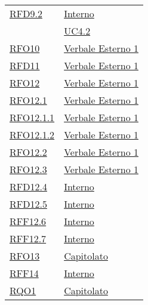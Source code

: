 \begin{longtable}{|>{\centering}m{5cm}|m{5cm}<{\centering}|}
\hyperlink{RFD9.2}{RFD9.2} & \hyperlink{Interno}{Interno}\\
& \hyperref[UC4.2]{UC4.2}\\ \hline

\hyperlink{RFO10}{RFO10} & \hyperlink{Verbale Esterno 1}{Verbale Esterno 1}\\ \hline

\hyperlink{RFD11}{RFD11} & \hyperlink{Verbale Esterno 1}{Verbale Esterno 1}\\ \hline

\hyperlink{RFO12}{RFO12} & \hyperlink{Verbale Esterno 1}{Verbale Esterno 1}\\ \hline

\hyperlink{RFO12.1}{RFO12.1} & \hyperlink{Verbale Esterno 1}{Verbale Esterno 1}\\ \hline

\hyperlink{RFO12.1.1}{RFO12.1.1} & \hyperlink{Verbale Esterno 1}{Verbale Esterno 1}\\ \hline

\hyperlink{RFO12.1.2}{RFO12.1.2} & \hyperlink{Verbale Esterno 1}{Verbale Esterno 1}\\ \hline

\hyperlink{RFO12.2}{RFO12.2} & \hyperlink{Verbale Esterno 1}{Verbale Esterno 1}\\ \hline

\hyperlink{RFO12.3}{RFO12.3} & \hyperlink{Verbale Esterno 1}{Verbale Esterno 1}\\ \hline

\hyperlink{RFD12.4}{RFD12.4} & \hyperlink{Interno}{Interno}\\ \hline

\hyperlink{RFD12.5}{RFD12.5} & \hyperlink{Interno}{Interno}\\ \hline

\hyperlink{RFF12.6}{RFF12.6} & \hyperlink{Interno}{Interno}\\ \hline

\hyperlink{RFF12.7}{RFF12.7} & \hyperlink{Interno}{Interno}\\ \hline

\hyperlink{RFO13}{RFO13} & \hyperlink{Capitolato}{Capitolato}\\ \hline

\hyperlink{RFF14}{RFF14} & \hyperlink{Interno}{Interno}\\ \hline

\hyperlink{RQO1}{RQO1} & \hyperlink{Capitolato}{Capitolato}\\ \hline


\end{longtable}
